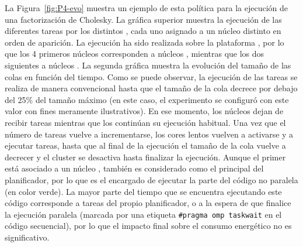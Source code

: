 La Figura~\ref{fig:P4-evo} muestra un ejemplo de esta política para la
ejecución de una factorización de Cholesky. La gráfica superior muestra la
ejecución de las diferentes tareas por los distintos \wts, cada uno
asignado a un núcleo distinto en orden de aparición. La ejecución ha sido
realizada sobre la plataforma \juno, por lo que los 4 primeros núcleos
corresponden a núcleos \LITTLE, mientras que los dos siguientes a núcleos
\big. La segunda gráfica muestra la evolución del tamaño de las colas en
función del tiempo. Como se puede observar, la ejecución de las tareas se
realiza de manera convencional hasta que el tamaño de la cola decrece por debajo
del 25\% del tamaño máximo (en este caso, el experimento se configuró con este valor
con fines meramente ilustrativos). En ese momento, los núcleos \LITTLE dejan de recibir tareas mientras que los \BIG
continúan su ejecución habitual. Una vez que el número de tareas vuelve a
incrementarse, los cores lentos vuelven a activarse y a ejecutar tareas,
hasta que al final de la ejecución el tamaño de la cola vuelve a decrecer
y el cluster se desactiva hasta finalizar la ejecución. Aunque el primer
\wt está asociado a un núcleo \LITTLE, también es considerado como el \wt
principal del planificador, por lo que es el encargado de ejecutar la parte
del código no paralela (en color verde). La mayor parte del tiempo que se
encuentra ejecutando este código corresponde a tareas del propio
planificador, o a la espera de que finalice la ejecución paralela (marcada
por una etiqueta \texttt{\#pragma omp taskwait} en el código secuencial),
por lo que el impacto final sobre el consumo energético no es significativo.

